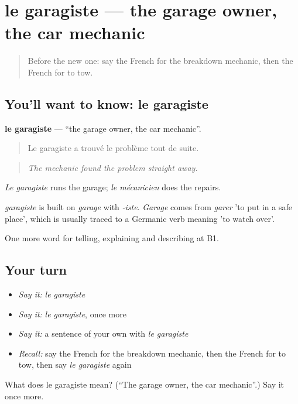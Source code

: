 \section[le garagiste]{le garagiste — the garage owner, the car mechanic}

\label{lesson:FR-C405-garagiste}



\begin{quote}
Before the new one: say the French for the breakdown mechanic, then the French for to tow.
\end{quote}

\subsection*{You'll want to know: le garagiste}
\textbf{le garagiste} — \textquotedblleft{}the garage owner, the car mechanic\textquotedblright{}.

\begin{quote}
Le garagiste a trouvé le problème tout de suite.
\end{quote}

\begin{quote}
\emph{The mechanic found the problem straight away.}
\end{quote}

\emph{Le garagiste} runs the garage; \emph{le mécanicien} does the repairs.

\begin{cousinweb}
\emph{garagiste} is built on \emph{garage} with \emph{-iste}. \emph{Garage} comes from \emph{garer} 'to put in a safe place', which is usually traced to a Germanic verb meaning 'to watch over'.
\end{cousinweb}

\begin{grammarlens}[title={What you've built}]
One more word for telling, explaining and describing at B1.
\end{grammarlens}

\subsection*{Your turn}
\begin{itemize}
\raggedright
  \item \emph{Say it:} \emph{le garagiste}
  \item \emph{Say it:} \emph{le garagiste}, once more
  \item \emph{Say it:} a sentence of your own with \emph{le garagiste}
  \item \emph{Recall:} say the French for the breakdown mechanic, then the French for to tow, then say \emph{le garagiste} again
\end{itemize}

\begin{tcolorbox}[breakable,colback=teal!4,colframe=teal!35!black,title={Before you move on}]
What does le garagiste mean? (\textquotedblleft{}The garage owner, the car mechanic\textquotedblright{}.) Say it once more.
\end{tcolorbox}
